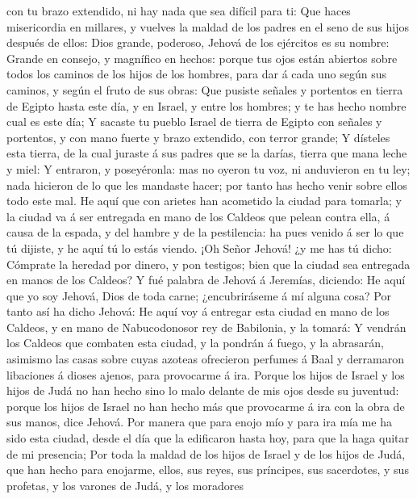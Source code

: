 con tu brazo extendido, ni hay nada que sea difícil para ti:
 Que haces misericordia en millares, y vuelves la maldad de
los padres en el seno de sus hijos después de ellos: Dios grande,
poderoso, Jehová de los ejércitos es su nombre:  Grande en
consejo, y magnífico en hechos: porque tus ojos están abiertos sobre
todos los caminos de los hijos de los hombres, para dar á cada uno según
sus caminos, y según el fruto de sus obras:  Que pusiste
señales y portentos en tierra de Egipto hasta este día, y en Israel, y
entre los hombres; y te has hecho nombre cual es este día; 
Y sacaste tu pueblo Israel de tierra de Egipto con señales y portentos,
y con mano fuerte y brazo extendido, con terror grande;  Y
dísteles esta tierra, de la cual juraste á sus padres que se la darías,
tierra que mana leche y miel:  Y entraron, y poseyéronla:
mas no oyeron tu voz, ni anduvieron en tu ley; nada hicieron de lo que
les mandaste hacer; por tanto has hecho venir sobre ellos todo este mal.
 He aquí que con arietes han acometido la ciudad para
tomarla; y la ciudad va á ser entregada en mano de los Caldeos que
pelean contra ella, á causa de la espada, y del hambre y de la
pestilencia: ha pues venido á ser lo que tú dijiste, y he aquí tú lo
estás viendo.  ¡Oh Señor Jehová! ¿y me has tú dicho:
Cómprate la heredad por dinero, y pon testigos; bien que la ciudad sea
entregada en manos de los Caldeos?  Y fué palabra de Jehová
á Jeremías, diciendo:  He aquí que yo soy Jehová, Dios de
toda carne; ¿encubriráseme á mí alguna cosa?  Por tanto así
ha dicho Jehová: He aquí voy á entregar esta ciudad en mano de los
Caldeos, y en mano de Nabucodonosor rey de Babilonia, y la tomará:
 Y vendrán los Caldeos que combaten esta ciudad, y la
pondrán á fuego, y la abrasarán, asimismo las casas sobre cuyas azoteas
ofrecieron perfumes á Baal y derramaron libaciones á dioses ajenos, para
provocarme á ira.  Porque los hijos de Israel y los hijos
de Judá no han hecho sino lo malo delante de mis ojos desde su juventud:
porque los hijos de Israel no han hecho más que provocarme á ira con la
obra de sus manos, dice Jehová.  Por manera que para enojo
mío y para ira mía me ha sido esta ciudad, desde el día que la
edificaron hasta hoy, para que la haga quitar de mi presencia;
 Por toda la maldad de los hijos de Israel y de los hijos
de Judá, que han hecho para enojarme, ellos, sus reyes, sus príncipes,
sus sacerdotes, y sus profetas, y los varones de Judá, y los moradores

